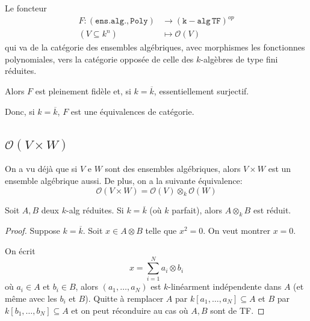 \begin{proposition}{}
    Le foncteur
  \begin{align*}
      F: {(\mathtt{ens.alg.}, \mathtt{ Poly})} &\longrightarrow
      {(\mathtt{k-alg} \, \mathtt{TF})}^{op}\\
       {(V \subseteq k^{n})}&\longmapsto \mathcal{O}{(V)}
  \end{align*}
    qui va de la catégorie des ensembles algébriques, avec morphismes les
    fonctionnes polynomiales, vers la catégorie opposée de celle des
    \(k\)-algèbres de type fini réduites.

    Alors \(F\) est pleinement fidèle et, si \(k = \overline{k}\), essentiellement surjectif.

    Donc, si \(k = \overline{k}\), \(F\) est une équivalences de catégorie.
\end{proposition}


\subsection{\(\mathcal{O}{(V \times  W)}\)}

On a vu déjà que si \(V\) e \(W\) sont des ensembles algébriques, alors \(V
\times  W\) est un ensemble algébrique aussi. De plus, on a la suivante
équivalence:
\[
  \mathcal{O}{(V \times W)} = \mathcal{O}{(V)} \otimes_k \mathcal{O}{(W)}
\]

\begin{lemma}{}
    Soit \(A, B\) deux \(k\)-alg réduites. Si \(k = \overline{k}\) (où
    \(k\) parfait), alors \(A
    \otimes_k B\) est réduit.
\end{lemma}

\begin{proof}{}
    Suppose \(k = \overline{k}\). Soit \(x \in A \otimes B\) telle que \(x^2 =
    0\). On veut montrer \(x = 0\).

    On écrit 
    \[
      x = \sum_{i=1}^{N} a_{i} \otimes b_{i} 
    \]
    où \(a_{i} \in A\) et \(b_{i} \in B\), alors \({(a_{1}, \dots, a_N)}\) est
    \(k\)-linéarment indépendente dans \(A\) (et même avec les \(b_{i}\) et
    \(B\)).
    Quitte à remplacer \(A\) par \(k[a_{1}, \dots, a_N] \subseteq A \) et \(B\)
    par \(k[b_{1}, \dots, b_N] \subseteq A \) et on peut réconduire au cas où
    \(A, B\) sont de TF. %
\end{proof}


